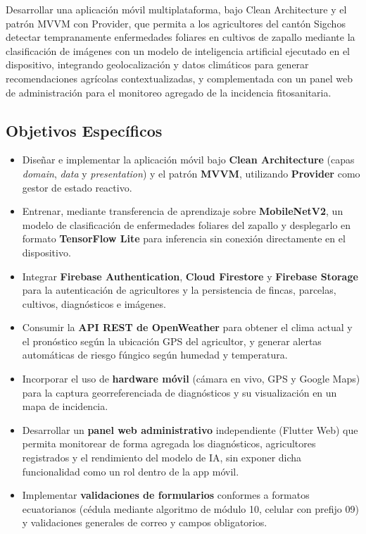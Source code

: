 \documentclass[12pt,a4paper]{article}
\begin{document}
Desarrollar una aplicación móvil multiplataforma, bajo Clean Architecture y el
patrón MVVM con Provider, que permita a los agricultores del cantón Sigchos
detectar tempranamente enfermedades foliares en cultivos de zapallo mediante la
clasificación de imágenes con un modelo de inteligencia artificial ejecutado en
el dispositivo, integrando geolocalización y datos climáticos para generar
recomendaciones agrícolas contextualizadas, y complementada con un panel web de
administración para el monitoreo agregado de la incidencia fitosanitaria.

\subsection{Objetivos Específicos}

\begin{itemize}
  \item Diseñar e implementar la aplicación móvil bajo \textbf{Clean
        Architecture} (capas \textit{domain}, \textit{data} y
        \textit{presentation}) y el patrón \textbf{MVVM}, utilizando
        \textbf{Provider} como gestor de estado reactivo.
  \item Entrenar, mediante transferencia de aprendizaje sobre
        \textbf{MobileNetV2}, un modelo de clasificación de enfermedades
        foliares del zapallo y desplegarlo en formato \textbf{TensorFlow Lite}
        para inferencia sin conexión directamente en el dispositivo.
  \item Integrar \textbf{Firebase Authentication}, \textbf{Cloud Firestore} y
        \textbf{Firebase Storage} para la autenticación de agricultores y la
        persistencia de fincas, parcelas, cultivos, diagnósticos e imágenes.
  \item Consumir la \textbf{API REST de OpenWeather} para obtener el clima
        actual y el pronóstico según la ubicación GPS del agricultor, y generar
        alertas automáticas de riesgo fúngico según humedad y temperatura.
  \item Incorporar el uso de \textbf{hardware móvil} (cámara en vivo, GPS y
        Google Maps) para la captura georreferenciada de diagnósticos y su
        visualización en un mapa de incidencia.
  \item Desarrollar un \textbf{panel web administrativo} independiente
        (Flutter Web) que permita monitorear de forma agregada los
        diagnósticos, agricultores registrados y el rendimiento del modelo de
        IA, sin exponer dicha funcionalidad como un rol dentro de la app móvil.
  \item Implementar \textbf{validaciones de formularios} conformes a formatos
        ecuatorianos (cédula mediante algoritmo de módulo 10, celular con
        prefijo 09) y validaciones generales de correo y campos obligatorios.
\end{itemize}
\end{document}
